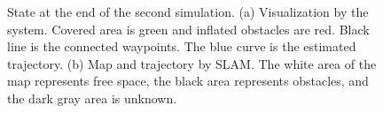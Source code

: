 \begin{figure}[h!]
    \centering
	\caption[State at the end of the second simulation.]{State at the end of the second simulation. (a) Visualization by the system. Covered area is green and inflated obstacles are red. Black line is the connected waypoints. The blue curve is the estimated trajectory. (b) Map and trajectory by SLAM. The white area of the map represents free space, the black area represents obstacles, and the dark gray area is unknown.}
	\label{fig:bm2_alg_res}
\end{figure}

